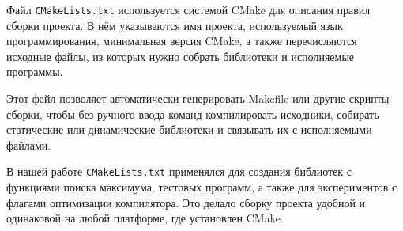 Файл \texttt{CMakeLists.txt} используется системой CMake для описания правил сборки проекта. В нём указываются имя проекта, используемый язык программирования, минимальная версия CMake, а также перечисляются исходные файлы, из которых нужно собрать библиотеки и исполняемые программы.

Этот файл позволяет автоматически генерировать Makefile или другие скрипты сборки, чтобы без ручного ввода команд компилировать исходники, собирать статические или динамические библиотеки и связывать их с исполняемыми файлами.

В нашей работе \texttt{CMakeLists.txt} применялся для создания библиотек с функциями поиска максимума, тестовых программ, а также для экспериментов с флагами оптимизации компилятора. Это делало сборку проекта удобной и одинаковой на любой платформе, где установлен CMake.